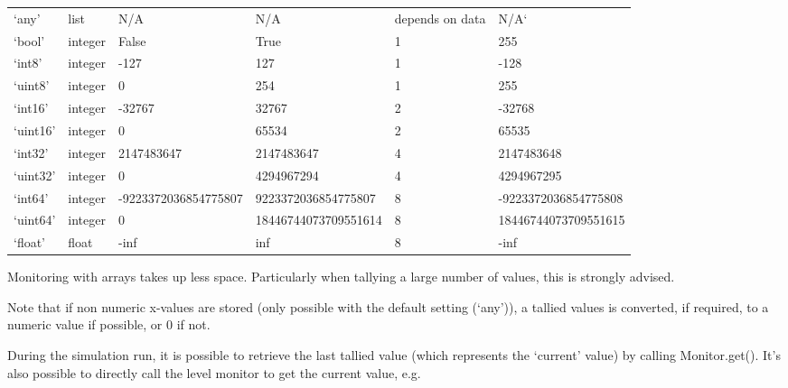 \documentclass[letterpaper,10pt,english]{sphinxmanual}
\begin{document}
\begin{savenotes}\sphinxattablestart
\centering
\begin{tabulary}{\linewidth}[t]{|T|T|T|T|T|T|}
\hline
{}\relax &\relax &\relax &\relax &\relax &\relax \\
\hline
‘any’
&
list
&
N/A
&
N/A
&
depends on data
&
N/A{}`
\\
\hline
‘bool’
&
integer
&
False
&
True
&
1
&
255
\\
\hline
‘int8’
&
integer
&
-127
&
127
&
1
&
-128
\\
\hline
‘uint8’
&
integer
&
0
&
254
&
1
&
255
\\
\hline
‘int16’
&
integer
&
-32767
&
32767
&
2
&
-32768
\\
\hline
‘uint16’
&
integer
&
0
&
65534
&
2
&
65535
\\
\hline
‘int32’
&
integer
&
2147483647
&
2147483647
&
4
&
2147483648
\\
\hline
‘uint32’
&
integer
&
0
&
4294967294
&
4
&
4294967295
\\
\hline
‘int64’
&
integer
&
-9223372036854775807
&
9223372036854775807
&
8
&
-9223372036854775808
\\
\hline
‘uint64’
&
integer
&
0
&
18446744073709551614
&
8
&
18446744073709551615
\\
\hline
‘float’
&
float
&
-inf
&
inf
&
8
&
-inf
\\
\hline
\end{tabulary}
\par
\sphinxattableend\end{savenotes}

Monitoring with arrays takes up less space. Particularly when tallying a large
number of values, this is strongly advised.

Note that if non numeric x-values are stored (only possible with the default setting (‘any’)),
a tallied values is converted, if required, to a numeric value if possible, or 0 if not.

During the simulation run, it is possible to retrieve the last tallied value (which represents the ‘current’ value)
by calling Monitor.get(). 
It’s also possible to directly call the level monitor to get the current value, e.g.
\end{document}
